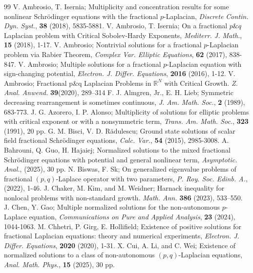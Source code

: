 \documentclass[10pt,a4paper]{amsart}
\numberwithin{equation}{section}
\begin{document}
\begin{thebibliography}{99}
 V. Ambrosio, T. Isernia; Multiplicity and concentration results for some nonlinear Schr\"{o}dinger equations with the fractional $p$-Laplacian, \emph{Discrete Contin. Dyn. Syst.}, \textbf{38} (2018), 5835-5881.
 V. Ambrosio, T. Isernia; On a fractional $p\&q$ Laplacian problem with Critical Sobolev-Hardy Exponents, \emph{Mediterr. J. Math.}, \textbf{15} (2018), 1-17.
 V. Ambrosio; Nontrivial solutions for a fractional $p$-Laplacian problem via Rabier Theorem, \emph{Complex Var. Elliptic Equations}, \textbf{62} (2017), 838-847.
 V. Ambrosio; Multiple solutions for a fractional $p$-Laplacian equation with sign-changing potential, \emph{Electron. J. Differ. Equations}, \textbf{2016} (2016), 1-12.
 V. Ambrosio; Fractional p\&q Laplacian Problems in $\mathbb{R}^N$  with Critical Growth. \emph{Z. Anal. Anwend.} \textbf{39}(2020), 289–314
 F. J. Almgren, Jr.,  E. H. Lieb; Symmetric decreasing rearrangement is sometimes continuous, \emph{J. Am. Math. Soc.}, \textbf{2} (1989), 683-773.
 J. G. Azorero, I. P. Alonso; Multiplicity of solutions for elliptic problems with critical exponent or with a nonsymmetric term, \emph{Trans. Am. Math. Soc.}, \textbf{323} (1991), 20 pp.
 G. M. Bisci, V. D. R\u{a}dulescu; Ground state solutions of scalar field fractional Schr\"{o}dinger equations, \emph{Calc. Var.}, \textbf{54} (2015), 2985-3008.
 A. Bahrouni, Q. Guo, H. Hajaiej; Normalized solutions to the mixed fractional Schr\"{o}dinger equations with potential and general nonlinear term, \emph{Asymptotic. Anal.}, \textbf{} (2025), 30 pp.
 N. Biswas, F. Sk; On generalized eigenvalue problems of fractional $(p, q)$-Laplace operator with two parameters, \emph{P. Roy. Soc. Edinb. A.}, \textbf{} (2022), 1-46.
 J. Chaker, M. Kim, and M. Weidner; Harnack inequality for nonlocal problems with non-standard growth. \emph{Math. Ann.} \textbf{386} (2023), 533–550.
 J. Chen,  Y. Gao; Multiple normalized solutions for the non-autonomous $p$-Laplace equation, \emph{Communications on Pure and Applied Analysis}, \textbf{23} (2024), 1044-1063.
 M. Chhetri, P. Girg, E. Hollifield; Existence of positive solutions for fractional Laplacian equations: theory and numerical experiments, \emph{Electron. J. Differ. Equations}, \textbf{2020} (2020), 1-31.
 X. Cui, A. Li, and C. Wei; Existence of normalized solutions to a class of non-autonomous $(p, q)$-Laplacian equations, \emph{Anal. Math. Phys.}, \textbf{15} (2025), 30 pp.

\end{thebibliography}
\end{document}
